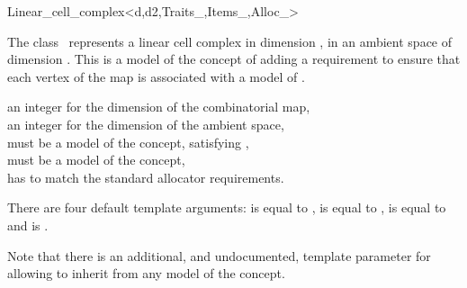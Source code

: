 \ccRefPageBegin
\begin{ccRefClass}{Linear_cell_complex<d,d2,Traits_,Items_,Alloc_>}


\ccDefinition
  
The class \ccRefName\ represents a linear cell complex in dimension ,
in an ambient space of dimension . This is a model of the concept of
 adding a requirement to ensure that
each vertex of the map is associated with a
model of .

\ccIsModel
{}

\ccInheritsFrom
{}

\ccParameters
{} an integer for the dimension of the combinatorial map,\\
 an integer for the dimension of the ambient space,\\
 must be a model of the  concept, satisfying ,\\
 must be a model of the  concept,\\
 has to match the standard allocator requirements. 

There are four default template arguments:
 is equal to ,
 is equal to ,
 is equal to  and
 is .

\begin{ccAdvanced}
  Note that there is an additional, and undocumented, template
  parameter  for
   allowing
  to inherit from any model of the  concept.
\end{ccAdvanced}


\end{ccRefClass}
